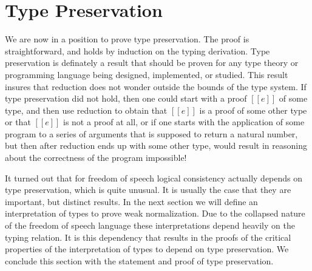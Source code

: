 \section{Type Preservation}
\label{sec:type_preservation}
We are now in a position to prove type preservation.  The proof is
straightforward, and holds by induction on the typing derivation.
Type preservation is definately a result that should be proven for any
type theory or programming language being designed, implemented, or
studied.  This result insures that reduction does not wonder outside
the bounds of the type system.  If type preservation did not hold,
then one could start with a proof $[[e]]$ of some type, and then use
reduction to obtain that $[[e]]$ is a proof of some other type or that
$[[e]]$ is not a proof at all, or if one starts with the application
of some program to a series of arguments that is supposed to return a
natural number, but then after reduction ends up with some other type,
would result in reasoning about the correctness of the program
impossible!

It turned out that for freedom of speech logical consistency actually
depends on type preservation, which is quite unusual.  It is usually
the case that they are important, but distinct results.  In the next
section we will define an interpretation of types to prove weak
normalization.  Due to the collapsed nature of the freedom of speech
language these interpretations depend heavily on the typing
relation. It is this dependency that results in the proofs of the
critical properties of the interpretation of types to depend on type
preservation.  We conclude this section with the statement and proof
of type preservation.
 
